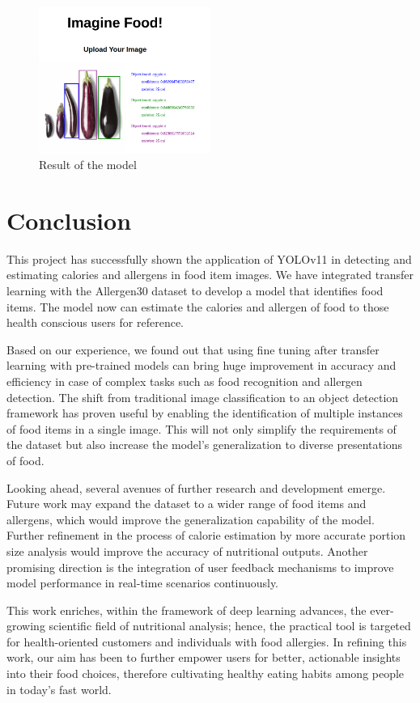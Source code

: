 \documentclass[10pt,twocolumn,letterpaper]{article}
\begin{document}
\begin{figure}[htbp]
    \centering
    \includegraphics[width=0.5\textwidth]{advanced-detector.png}
    \caption{Result of the model}\label{advanced-client-result}
\end{figure}

\section{Conclusion}

This project has successfully shown the application of YOLOv11 in detecting and estimating calories and allergens in food item images. 
We have integrated transfer learning with the Allergen30 dataset to develop a model that identifies food items. 
The model now can estimate the calories and allergen of food to those health conscious users for reference.

Based on our experience, we found out that using fine tuning after transfer learning with pre-trained models can bring huge improvement in accuracy and efficiency in case of complex tasks such as food recognition and allergen detection. 
The shift from traditional image classification to an object detection framework has proven useful by enabling the identification of multiple instances of food items in a single image. 
This will not only simplify the requirements of the dataset but also increase the model's generalization to diverse presentations of food.

Looking ahead, several avenues of further research and development emerge. 
Future work may expand the dataset to a wider range of food items and allergens, which would improve the generalization capability of the model. 
Further refinement in the process of calorie estimation by more accurate portion size analysis would improve the accuracy of nutritional outputs. 
Another promising direction is the integration of user feedback mechanisms to improve model performance in real-time scenarios continuously.

This work enriches, within the framework of deep learning advances, the ever-growing scientific field of nutritional analysis; hence, the practical tool is targeted for health-oriented customers and individuals with food allergies. 
In refining this work, our aim has been to further empower users for better, actionable insights into their food choices, therefore cultivating healthy eating habits among people in today's fast world.

{
    \small
    
    
}
\end{document}
